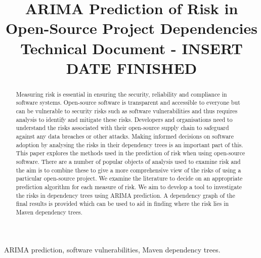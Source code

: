 \documentclass[conference]{IEEEtran}
\begin{document}
\title{ARIMA Prediction of Risk in \\Open-Source Project Dependencies\\
{\footnotesize Technical Document - INSERT DATE FINISHED}
}

\author{
\and
{}
    }

\maketitle
\thispagestyle{plain}
\pagestyle{plain}

\begin{abstract}
Measuring risk is essential in ensuring the security, reliability and compliance in software systems. Open-source software is transparent and accessible to everyone but can be vulnerable to security risks such as software vulnerabilities and thus requires analysis to identify and mitigate these risks. Developers and organisations need to understand the risks associated with their open-source supply chain to safeguard against any data breaches or other attacks. Making informed decisions on software adoption by analysing the risks in their dependency trees is an important part of this. This paper explores the methods used in the prediction of risk when using open-source software. There are a number of popular objects of analysis used to examine risk and the aim is to combine these to give a more comprehensive view of the risks of using a particular open-source project. We examine the literature to decide on an appropriate prediction algorithm for each measure of risk. We aim to develop a tool to investigate the risks in dependency trees using ARIMA prediction. A dependency graph of the final results is provided which can be used to aid in finding where the risk lies in Maven dependency trees. 
\end{abstract}

\begin{IEEEkeywords}
ARIMA prediction, software vulnerabilities, Maven dependency trees.
\end{IEEEkeywords}
\end{document}
